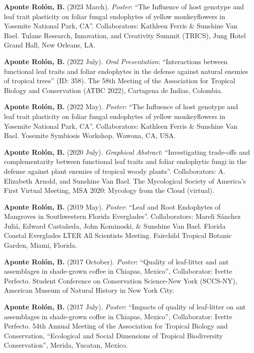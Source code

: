 \documentclass[
  letterpaper,
  DIV=11,
  numbers=noendperiod]{scrartcl}
\begin{document}
\textbf{Aponte Rolón, B.} (2023 March). \emph{Poster}: ``The Influence
of host genotype and leaf trait plasticity on foliar fungal endophytes
of yellow monkeyflowers in Yosemite National Park, CA''. Collaborators:
Kathleen Ferris \& Sunshine Van Bael. Tulane Research, Innovation, and
Creativity Summit (TRICS), Jung Hotel Grand Hall, New Orleans, LA.

\textbf{Aponte Rolón, B.} (2022 July). \emph{Oral Presentation}:
``Interactions between functional leaf traits and foliar endophytes in
the defense against natural enemies of tropical trees'' (ID: 358). The
58th Meeting of the Association for Tropical Biology and Conservation
(ATBC 2022), Cartagena de Indias, Colombia.

\textbf{Aponte Rolón, B.} (2022 May). \emph{Poster}: ``The Influence of
host genotype and leaf trait plasticity on foliar fungal endophytes of
yellow monkeyflowers in Yosemite National Park, CA''. Collaborators:
Kathleen Ferris \& Sunshine Van Bael. Yosemite Symbiosis Workshop.
Wawona, CA, USA.

\textbf{Aponte Rolón, B.} (2020 July). \emph{Graphical Abstract}:
``Investigating trade-offs and complementarity between functional leaf
traits and foliar endophytic fungi in the defense against plant enemies
of tropical woody plants''. Collaborators: A. Elizabeth Arnold, and
Sunshine Van Bael. The Mycological Society of America's First Virtual
Meeting, MSA 2020: Mycology from the Cloud (virtual).

\textbf{Aponte Rolón, B.} (2019 May). \emph{Poster}: ``Leaf and Root
Endophytes of Mangroves in Southwestern Florida Everglades''.
Collaborators: Mareli Sánchez Juliá, Edward Castañeda, John Kominoski,
\& Sunshine Van Bael. Florida Coastal Everglades LTER All Scientists
Meeting. Fairchild Tropical Botanic Garden, Miami, Florida.

\textbf{Aponte Rolón, B.} (2017 October). \emph{Poster}: ``Quality of
leaf-litter and ant assemblages in shade-grown coffee in Chiapas,
Mexico'', Collaborator: Ivette Perfecto. Student Conference on
Conservation Science-New York (SCCS-NY), American Museum of Natural
History in New York City.

\textbf{Aponte Rolón, B.} (2017 July). \emph{Poster}: ``Impacts of
quality of leaf-litter on ant assemblages in shade-grown coffee in
Chiapas, Mexico'', Collaborator: Ivette Perfecto. 54th Annual Meeting of
the Association for Tropical Biology and Conservation, ``Ecological and
Social Dimensions of Tropical Biodiversity Conservation'', Merida,
Yucatan, Mexico.
\end{document}
